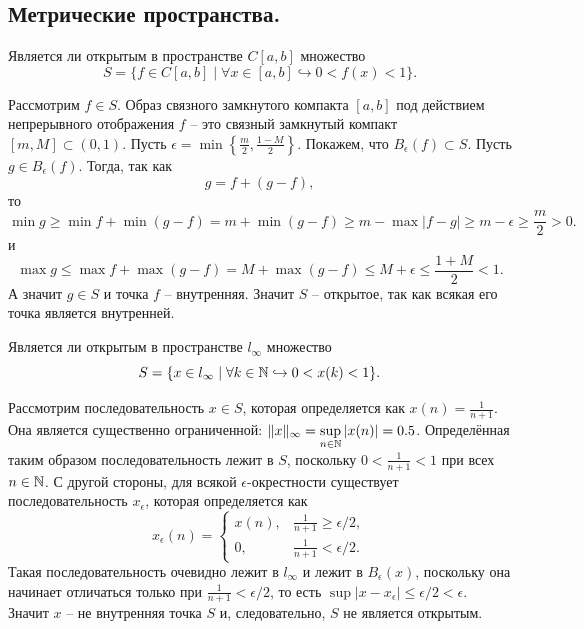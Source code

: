 \subsection{Метрические пространства.}
\begin{task}[\S 1.3]
    Является ли открытым в пространстве $C[a, b]$ множество
    \[
        S = \{f \in C[a, b] \mid \forall x \in [a, b] \hookrightarrow 0 < f(x) < 1\}.
    \]
\end{task}
\begin{solve}
    Рассмотрим $f \in S$. Образ связного замкнутого компакта $[a, b]$ под действием непрерывного отображения $f$ -- это связный замкнутый компакт $[m, M] \subset (0, 1)$. Пусть $\epsilon = \min\left\{\frac{m}{2}, \frac{1 - M}{2}\right\}$. Покажем, что $B_\epsilon(f) \subset S$. Пусть $g \in B_\epsilon(f)$. Тогда, так как
    \[
        g = f + (g - f),
    \]
    то
    \[
        \min g \geq \min f + \min (g - f) = m + \min(g - f) \geq m - \max |f - g| \geq m - \epsilon \geq \frac{m}{2} > 0.
    \]
    и
    \[
        \max g \leq \max f + \max (g - f) = M + \max (g - f) \leq M + \epsilon \leq \frac{1 + M}{2} < 1.
    \]
    А значит $g \in S$ и точка $f$ -- внутренняя. Значит $S$ -- открытое, так как всякая его точка является внутренней.
\end{solve}
\begin{task}[\S 1.4]
    Является ли открытым в пространстве $l_\infty$ множество
    \[
        S = \{x \in l_\infty \mid \forall k \in \mathbb{N} \hookrightarrow 0 < x(k) < 1\}.
    \]
\end{task}
\begin{solve}
    Рассмотрим последовательность $x \in S$, которая определяется как $x(n) = \frac{1}{n + 1}$. Она является существенно ограниченной: $\|x\|_\infty = \sup\limits_{n \in \mathbb{N}} |x(n)| = 0.5$. Определённая таким образом последовательность лежит в $S$, поскольку $0 < \frac{1}{n + 1} < 1$ при всех $n \in \mathbb{N}$. С другой стороны, для всякой $\epsilon$-окрестности существует последовательность $x_\epsilon$, которая определяется как
    \[
        x_\epsilon(n) = \begin{cases}
                            x(n), & \frac{1}{n + 1} \geq \epsilon/2, \\
                            0, & \frac{1}{n + 1} < \epsilon/2.
        \end{cases}
    \]
    Такая последовательность очевидно лежит в $l_\infty$ и лежит в $B_\epsilon(x)$, поскольку она начинает отличаться только при $\frac{1}{n + 1} < \epsilon/2$, то есть $\sup |x - x_\epsilon| \leq \epsilon/2 < \epsilon$. Значит $x$ -- не внутренняя точка $S$ и, следовательно, $S$ не является открытым.
\end{solve}
